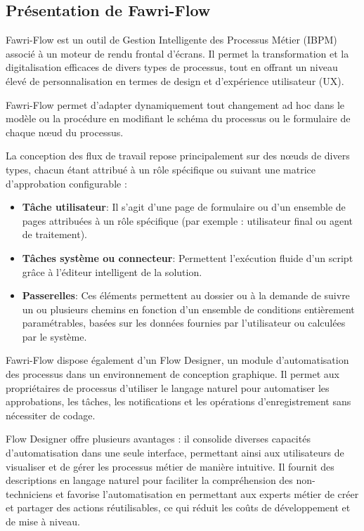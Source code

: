 \subsection{Présentation de Fawri-Flow}


\hspace{\parindent}Fawri-Flow est un outil de Gestion Intelligente des Processus Métier (IBPM) associé à un moteur de rendu frontal d'écrans. Il permet la transformation et la digitalisation efficaces de divers types de processus, tout en offrant un niveau élevé de personnalisation en termes de design et d'expérience utilisateur (UX).

Fawri-Flow permet d'adapter dynamiquement tout changement ad hoc dans le modèle ou la procédure en modifiant le schéma du processus ou le formulaire de chaque nœud du processus.

La conception des flux de travail repose principalement sur des nœuds de divers types, chacun étant attribué à un rôle spécifique ou suivant une matrice d'approbation configurable :

\begin{itemize}
\item \textbf{Tâche utilisateur}: Il s'agit d'une page de formulaire ou d'un ensemble de pages attribuées à un rôle spécifique (par exemple : utilisateur final ou agent de traitement).

\item \textbf{Tâches système ou connecteur}: Permettent l'exécution fluide d'un script grâce à l'éditeur intelligent de la solution.
\item \textbf{Passerelles}: Ces éléments permettent au dossier ou à la demande de suivre un ou plusieurs chemins en fonction d'un ensemble de conditions entièrement paramétrables, basées sur les données fournies par l'utilisateur ou calculées par le système.
\end{itemize}

Fawri-Flow dispose également d'un Flow Designer, un module d'automatisation des processus dans un environnement de conception graphique. Il permet aux propriétaires de processus d'utiliser le langage naturel pour automatiser les approbations, les tâches, les notifications et les opérations d'enregistrement sans nécessiter de codage.

Flow Designer offre plusieurs avantages : il consolide diverses capacités d'automatisation dans une seule interface, permettant ainsi aux utilisateurs de visualiser et de gérer les processus métier de manière intuitive. Il fournit des descriptions en langage naturel pour faciliter la compréhension des non-techniciens et favorise l'automatisation en permettant aux experts métier de créer et partager des actions réutilisables, ce qui réduit les coûts de développement et de mise à niveau.

